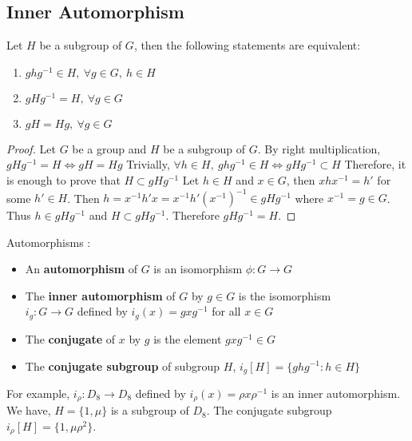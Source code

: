 \subsection{Inner Automorphism}
\begin{theorem}
	Let $H$ be a subgroup of $G$, then the following statements are equivalent:
	\begin{enumerate}
		\item $ghg^{-1} \in H,\ \forall g \in G,\ h \in H$
		\item $gHg^{-1} = H,\ \forall g \in G$
		\item $gH = Hg,\ \forall g \in G$
	\end{enumerate}
\end{theorem}
\begin{proof}
	Let $G$ be a group and $H$ be a subgroup of $G$.
	By right multiplication,  $gHg^{-1} = H \iff gH = Hg$
	Trivially, $\forall h \in H,\ ghg^{-1} \in H \iff gHg^{-1} \subset H$
	Therefore, it is enough to prove that $H \subset gHg^{-1}$
	Let $h \in H$ and $x \in G$, then $xhx^{-1} = h'$ for some $h' \in H$.
	Then $h = x^{-1}h'x = x^{-1}h'(x^{-1})^{-1} \in gHg^{-1}$ where $x^{-1} = g \in G$.
	Thus $h \in gHg^{-1}$ and $H \subset gHg^{-1}$.
	Therefore $gHg^{-1} = H$.
\end{proof}

\begin{definition}Automorphisms : 
	\begin{itemize}
		\item An \textbf{automorphism} of $G$ is an isomorphism $\phi : G \to G$
		\item The \textbf{inner automorphism} of $G$ by $g \in G$ is the isomorphism\\
			$i_g : G \to G$ defined by $i_g(x) = gxg^{-1}$ for all $x \in G$
		\item The \textbf{conjugate} of $x$ by $g$ is the element $gxg^{-1} \in G$
		\item The \textbf{conjugate subgroup} of subgroup $H$, $i_g[H] = \{ ghg^{-1} : h \in H \}$
	\end{itemize}
\end{definition}

\begin{remark}
	For example, $i_\rho : D_8 \to D_8$ defined by $i_\rho(x) = \rho x \rho^{-1}$ is an inner automorphism.
	We have, $H = \{ 1,\mu \}$ is a subgroup of $D_8$.
	The conjugate subgroup $i_\rho[H] = \{ 1,\mu\rho^2 \}$.
\end{remark}

